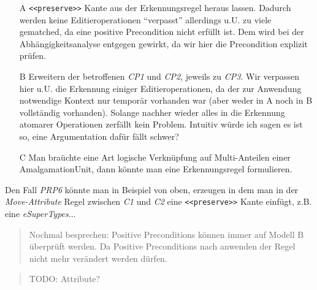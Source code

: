 \begin{enumerate}
   \begin{itemize}
    \item[A] \texttt{<<preserve>>} Kante aus der Erkennungsregel heraus lassen. 
    Dadurch werden keine Editieroperationen ``verpasst'' allerdings u.U. zu viele gematched,
    da eine positive Precondition nicht erfüllt ist.
    Dem wird bei der Abhängigkeitsanalyse entgegen gewirkt, da wir hier die Precondition
    explizit prüfen.
    \item[B] Erweitern der betroffenen \textit{CP1} und \textit{CP2}, jeweils zu \textit{CP3}.
    Wir verpassen hier u.U. die Erkennung einiger Editieroperationen, da der zur Anwendung
    notwendige Kontext nur temporär vorhanden war (aber weder in A noch in B vollständig vorhanden).
    Solange nachher wieder alles in die Erkennung atomarer Operationen zerfällt kein Problem.
    Intuitiv würde ich sagen es ist so, eine Argumentation dafür fällt schwer?
    \item[C] Man braüchte eine Art logische Verknüpfung auf Multi-Anteilen einer
    AmalgamationUnit, dann könnte man eine Erkennungsregel formulieren.
   \end{itemize}
   
\end{enumerate}

Den Fall \textit{PRP6} könnte man in Beispiel von oben, erzeugen in dem man in der
\textit{Move-Attribute} Regel zwischen \textit{C1} und \textit{C2} eine \texttt{<<preserve>>} Kante
einfügt, z.B. eine \textit{eSuperTypes}...

\begin{quote}Nochmal besprechen: Positive Preconditions können immer auf Modell B
überprüft werden. Da Positive Preconditions nach anwenden der Regel nicht mehr verändert
werden dürfen.\end{quote}

\begin{quote}TODO: Attribute?\end{quote}


